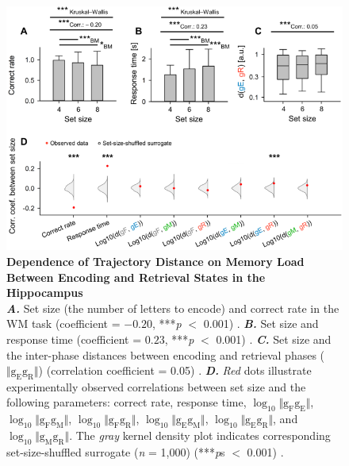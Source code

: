 \documentclass[final,3p,times,twocolumn]{elsarticle}
\begin{document}
        \begin{figure}[ht]
        	\centering
            \includegraphics[width=1\textwidth]{./src/figures/.png/Figure_ID_03.png}
        	\caption{\textbf{
Dependence of Trajectory Distance on Memory Load Between Encoding and Retrieval States in the Hippocampus 
}
\smallskip
\\
\textbf{\textit{A.}} Set size (the number of letters to encode) and correct rate in the WM task (coefficient = $-0.20$, ***\textit{p} $<$ 0.001) \cite{van_vugt_hippocampal_2010, li_functional_2023, borders_hippocampus_2022}. \textbf{\textit{B.}} Set size and response time (coefficient = $0.23$, ***\textit{p} $<$ 0.001) \cite{dimakopoulos_information_2022}.  \textbf{\textit{C.}} Set size and the inter-phase distances between encoding and retrieval phases ($\Vert \mathrm{g_{E}g_{R}} \Vert$) (correlation coefficient = 0.05) \cite{li_functional_2023}. \textbf{\textit{D.}} \textit{Red} dots illustrate experimentally observed correlations between set size and the following parameters: correct rate, response time, $\log_{10}{\Vert \mathrm{g_{F}g_{E}} \Vert}$, $\log_{10}{\Vert \mathrm{g_{F}g_{M}} \Vert}$, $\log_{10}{\Vert \mathrm{g_{F}g_{R}} \Vert}$, $\log_{10}{\Vert \mathrm{g_{E}g_{M}} \Vert}$, $\log_{10}{\Vert \mathrm{g_{E}g_{R}} \Vert}$, and $\log_{10}{\Vert \mathrm{g_{M}g_{R}} \Vert}$. The \textit{gray} kernel density plot indicates corresponding set-size-shuffled surrogate (\textit{n} = 1,000) (***\textit{p}s $<$ 0.001) \cite{norimoto_hippocampal_2018, hajos_input-output_2013}.
}
        	\label{fig:03}
        \end{figure}
\end{document}
